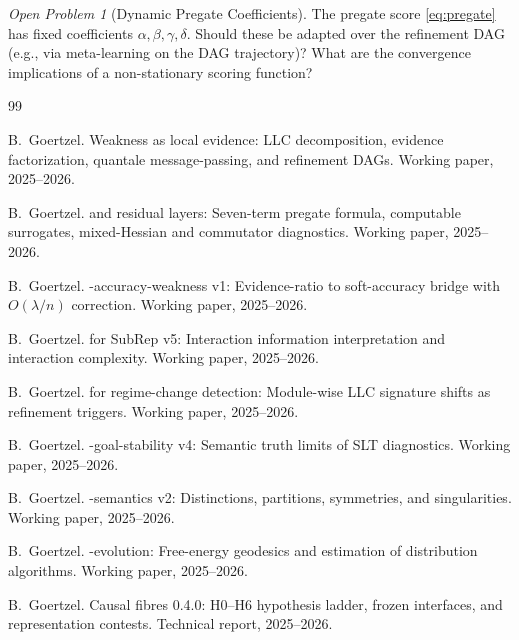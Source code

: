 \documentclass[11pt,a4paper]{article}
\theoremstyle{definition}
\theoremstyle{remark}
\newtheorem{openproblem}{Open Problem}
\begin{document}
\begin{openproblem}[Dynamic Pregate Coefficients]
  The pregate score \eqref{eq:pregate} has fixed coefficients
  $\alpha, \beta, \gamma, \delta$.  Should these be adapted over the
  refinement DAG (e.g., via meta-learning on the DAG trajectory)?  What are
  the convergence implications of a non-stationary scoring function?
\end{openproblem}

\begin{thebibliography}{99}

B.~Goertzel.
\newblock Weakness as local evidence: LLC decomposition, evidence
  factorization, quantale message-passing, and refinement DAGs.
\newblock Working paper, 2025--2026.

B.~Goertzel.
 and residual layers: Seven-term pregate formula, computable
  surrogates, mixed-{H}essian and commutator diagnostics.
\newblock Working paper, 2025--2026.

B.~Goertzel.
-accuracy-weakness v1: Evidence-ratio to soft-accuracy bridge
  with $O(\lambda/n)$ correction.
\newblock Working paper, 2025--2026.

B.~Goertzel.
 for {SubRep} v5: Interaction information interpretation and
  interaction complexity.
\newblock Working paper, 2025--2026.

B.~Goertzel.
 for regime-change detection: Module-wise {LLC} signature shifts
  as refinement triggers.
\newblock Working paper, 2025--2026.

B.~Goertzel.
-goal-stability v4: Semantic truth limits of {SLT} diagnostics.
\newblock Working paper, 2025--2026.

B.~Goertzel.
-semantics v2: Distinctions, partitions, symmetries, and
  singularities.
\newblock Working paper, 2025--2026.

B.~Goertzel.
-evolution: Free-energy geodesics and estimation of distribution
  algorithms.
\newblock Working paper, 2025--2026.

B.~Goertzel.
\newblock Causal fibres 0.4.0: {H0--H6} hypothesis ladder, frozen interfaces,
  and representation contests.
\newblock Technical report, 2025--2026.


\end{thebibliography}
\end{document}
